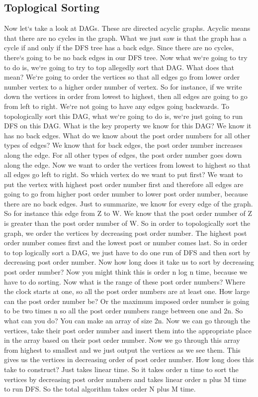 \subsection{Toplogical Sorting}
Now let`s take a look at DAGs.
These are directed acyclic graphs.
Acyclic means that there are no cycles in the graph.
What we just saw is that the graph has a cycle if and only if the DFS tree has a back edge.
Since there are no cycles, there`s going to be no back edges in our DFS tree.
Now what we`re going to try to do is, we`re going to try to top allegedly sort that DAG\@.
What does that mean? We`re going to order the vertices so that all edges go from lower order number vertex to a higher order number of vertex.
So for instance, if we write down the vertices in order from lowest to highest, then all edges are going to go from left to right.
We`re not going to have any edges going backwards.
To topologically sort this DAG, what we`re going to do is, we`re just going to run DFS on this DAG\@.
What is the key property we know for this DAG? We know it has no back edges.
What do we know about the post order numbers for all other types of edges? We know that for back edges, the post order number increases along the edge.
For all other types of edges, the post order number goes down along the edge.
Now we want to order the vertices from lowest to highest so that all edges go left to right.
So which vertex do we want to put first? We want to put the vertex with highest post order number first and therefore all edges are going to go from higher post order number to lower post order number, because there are no back edges.
Just to summarize, we know for every edge of the graph.
So for instance this edge from Z to W\@.
We know that the post order number of Z is greater than the post order number of W\@.
So in order to topologically sort the graph, we order the vertices by decreasing post order number.
The highest post order number comes first and the lowest post or number comes last.
So in order to top logically sort a DAG, we just have to do one run of DFS and then sort by decreasing post order number.
Now how long does it take us to sort by decreasing post order number? Now you might think this is order n log n time, because we have to do sorting.
Now what is the range of these post order numbers? Where the clock starts at one, so all the post order numbers are at least one.
How large can the post order number be? Or the maximum imposed order number is going to be two times n so all the post order numbers range between one and 2n.
So what can you do? You can make an array of size 2n.
Now we can go through the vertices, take their post order number and insert them into the appropriate place in the array based on their post order number.
Now we go through this array from highest to smallest and we just output the vertices as we see them.
This gives us the vertices in decreasing order of post order number.
How long does this take to construct? Just takes linear time.
So it takes order n time to sort the vertices by decreasing post order numbers and takes linear order n plus M time to run DFS\@.
So the total algorithm takes order N plus M time.

